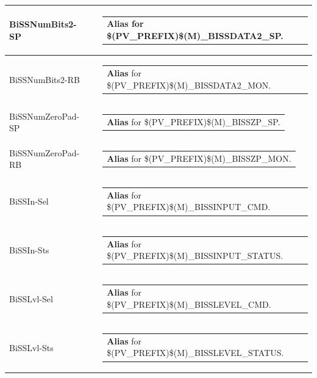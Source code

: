 \documentclass[openany]{article}
\begin{document}
\begin{longtable}{| m{4.5cm} m{2.5cm}  m{8.5cm} |}
        BiSSNumBits2-SP &  & \begin{tabular}{@{}m{6cm}@{}}
                \textbf{\color{blue} Alias} for \$(PV\_PREFIX)\$(M)\_BISSDATA2\_SP.
            \end{tabular} \hypertarget{}{}\\ \hline
        BiSSNumBits2-RB &  & \begin{tabular}{@{}m{6cm}@{}}
                \textbf{\color{blue} Alias} for \$(PV\_PREFIX)\$(M)\_BISSDATA2\_MON.
            \end{tabular} \hypertarget{pv:biss-num-zero-pad}{}\\ \hline
        BiSSNumZeroPad-SP &  & \begin{tabular}{@{}m{6cm}@{}}
                \textbf{\color{blue} Alias} for \$(PV\_PREFIX)\$(M)\_BISSZP\_SP.
            \end{tabular} \hypertarget{}{}\\ \hline
        BiSSNumZeroPad-RB &  & \begin{tabular}{@{}m{6cm}@{}}
                \textbf{\color{blue} Alias} for \$(PV\_PREFIX)\$(M)\_BISSZP\_MON.
            \end{tabular} \hypertarget{pv:biss-in}{}\\ \hline
        BiSSIn-Sel &  & \begin{tabular}{@{}m{6cm}@{}}
                \textbf{\color{blue} Alias} for \$(PV\_PREFIX)\$(M)\_BISSINPUT\_CMD.
            \end{tabular} \hypertarget{}{}\\ \hline
        BiSSIn-Sts &  & \begin{tabular}{@{}m{6cm}@{}}
                \textbf{\color{blue} Alias} for \$(PV\_PREFIX)\$(M)\_BISSINPUT\_STATUS.
            \end{tabular} \hypertarget{pv:biss-lvl}{}\\ \hline
        BiSSLvl-Sel &  & \begin{tabular}{@{}m{6cm}@{}}
                \textbf{\color{blue} Alias} for \$(PV\_PREFIX)\$(M)\_BISSLEVEL\_CMD.
            \end{tabular} \hypertarget{}{}\\ \hline
        BiSSLvl-Sts &  & \begin{tabular}{@{}m{6cm}@{}}
                \textbf{\color{blue} Alias} for \$(PV\_PREFIX)\$(M)\_BISSLEVEL\_STATUS.
            \end{tabular} \hypertarget{pv:dig-out-0}{}\\ \hline

\end{longtable}
\end{document}
